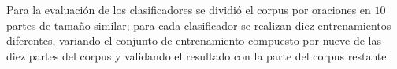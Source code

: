 \documentclass[runningheads,a4paper]{llncs}
\begin{document}

Para la evaluación de los clasificadores se dividió el corpus por oraciones en $10$ partes de tamaño similar; para cada clasificador se realizan diez entrenamientos diferentes, variando el conjunto de entrenamiento compuesto por nueve de las diez partes del corpus y validando el resultado con la parte del corpus restante. 



\end{document}
